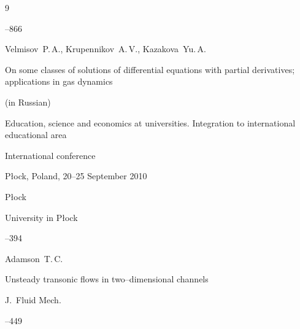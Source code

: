 \begin{thebibliography}{9}


--866




\by Velmisov~P.\,A., Krupennikov~A.\,V., Kazakova~Yu.\,A.

\paper On some classes of solutions of differential equations with partial derivatives; applications in gas dynamics \nofrills 

\paperinfo (in Russian)

\inbook Education, science and economics at universities. Integration to international educational area

\bookinfo International conference

\procinfo P\l ock, Poland, 20--25 September 2010 

\publaddr P\l ock 

\publ University in P\l ock


--394




\by Adamson~T.\,C.

\paper Unsteady transonic flows in two--dimensional channels

\jour J.~Fluid Mech.




--449



\end{thebibliography}



\noindent

\hskip6.5cm \thedate \par\noindent

\hskip6.5cm\therevdate\par





\vspace{-13mm}



\makeengtitle



\newpage



%

